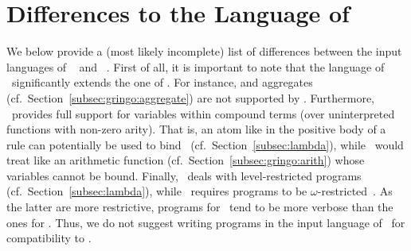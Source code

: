 \section{Differences to the Language of \lparse}\label{sec:lparse}

We below provide a (most likely incomplete) list of differences between the
input languages of \gringo~\cite{gescth07a} and \lparse~\cite{lparseManual}.
First of all, it is important to note that the language of \gringo\
significantly extends the one of \lparse.
For instance,  and  aggregates (cf.\ Section~\ref{subsec:gringo:aggregate})
are not supported by \lparse.
Furthermore, \gringo\ provides full support for variables within compound terms
(over uninterpreted functions with non-zero arity).
That is, an atom like  in the positive body of a rule
can potentially be used to bind~\var{X} (cf.\ Section~\ref{subsec:lambda}),
while \lparse\ would treat \code{\const{f}(\var{X})} like an arithmetic
function (cf.\ Section~\ref{subsec:gringo:arith}) whose variables cannot be bound.
Finally, \gringo\ deals with level-restricted programs (cf.\ Section~\ref{subsec:lambda}),
while \lparse\ requires programs to be $\omega$-restricted~\cite{syrjanen01a}.
As the latter are more restrictive,
programs for \lparse\ tend to be more verbose than the ones for \gringo.
Thus, we do not suggest writing programs in the input language of \gringo\
for compatibility to \lparse.

